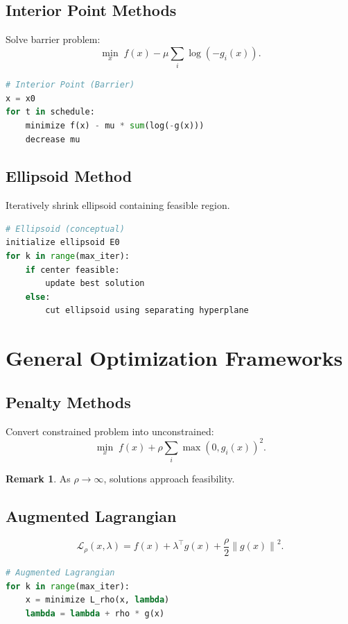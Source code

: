 \documentclass[12pt,oneside]{book}
\numberwithin{equation}{section}
\theoremstyle{definition}
\newtheorem{remark}{Remark}[section]
\theoremstyle{plain}
\theoremstyle{remark}
\newcommand{\norm}[1]{\left\lVert #1 \right\rVert}
\begin{document}
\subsection{Interior Point Methods}

Solve barrier problem:
\[
\min_x \; f(x) - \mu \sum_i \log(-g_i(x)).
\]

\begin{lstlisting}[language=Python]
# Interior Point (Barrier)
x = x0
for t in schedule:
    minimize f(x) - mu * sum(log(-g(x)))
    decrease mu
\end{lstlisting}

\subsection{Ellipsoid Method}

Iteratively shrink ellipsoid containing feasible region.

\begin{lstlisting}[language=Python]
# Ellipsoid (conceptual)
initialize ellipsoid E0
for k in range(max_iter):
    if center feasible:
        update best solution
    else:
        cut ellipsoid using separating hyperplane
\end{lstlisting}

\section{General Optimization Frameworks}

\subsection{Penalty Methods}

Convert constrained problem into unconstrained:
\[
\min_x \; f(x) + \rho \sum_i \max(0, g_i(x))^2.
\]

\begin{remark}
As $\rho \to \infty$, solutions approach feasibility.
\end{remark}

\subsection{Augmented Lagrangian}

\[
\mathcal{L}_\rho(x,\lambda) = f(x) + \lambda^\top g(x) + \frac{\rho}{2}\norm{g(x)}^2.
\]

\begin{lstlisting}[language=Python]
# Augmented Lagrangian
for k in range(max_iter):
    x = minimize L_rho(x, lambda)
    lambda = lambda + rho * g(x)
\end{lstlisting}
\end{document}
